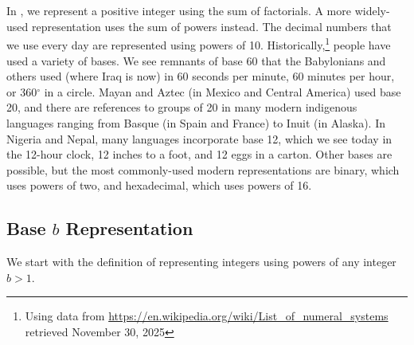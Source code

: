 \section{\secbinhex}
\label{sec_binary_hex}

In , we represent a positive integer using the sum of factorials.  A more widely-used representation uses the sum of powers instead.  The decimal numbers that we use every day are represented using powers of 10.  Historically,\footnote{Using data from \url{https://en.wikipedia.org/wiki/List_of_numeral_systems} retrieved November 30, 2025} people have used a variety of bases.  We see remnants of base 60 that the Babylonians and others used (where Iraq is now) in 60 seconds per minute, 60 minutes per hour, or 360$^\circ$ in a circle.  Mayan and Aztec (in Mexico and Central America) used base 20, and there are references to groups of 20 in many modern indigenous languages ranging from Basque (in Spain and France) to Inuit (in Alaska).  In Nigeria and Nepal, many languages incorporate base 12, which we see today in the 12-hour clock, 12 inches to a foot, and 12 eggs in a carton. Other bases are possible, but the most commonly-used modern representations are binary, which uses powers of two, and hexadecimal, which uses powers of 16.  

\newcommand{\subbaseb}{Base $b$ Representation}
\subsection{\subbaseb}
\label{sub_base_b}

We start with the definition of representing integers using powers of any integer $b>1$. 

